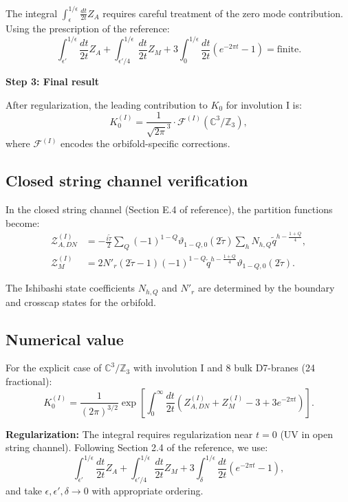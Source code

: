 \documentclass[11pt]{article}
\newcommand{\Z}{\mathbb{Z}}
\newcommand{\C}{\mathbb{C}}
\newcommand{\vt}{\vartheta}
\newcommand{\ttau}{\tilde{\tau}}
\newcommand{\ctau}{\check{\tau}}
\newcommand{\cq}{\check{q}}
\newcommand{\tq}{\tilde{q}}
\begin{document}
The integral $\int_{\epsilon}^{1/\epsilon} \frac{dt}{2t} Z_A$ requires careful treatment of the zero mode contribution. Using the prescription of the reference:
\begin{equation}
\int_{\epsilon'}^{1/\epsilon} \frac{dt}{2t} Z_A + \int_{\epsilon'/4}^{1/\epsilon} \frac{dt}{2t} Z_M + 3\int_0^{1/\epsilon} \frac{dt}{2t}(e^{-2\pi t} - 1) = \text{finite}.
\end{equation}

\textbf{Step 3: Final result}

After regularization, the leading contribution to $K_0$ for involution I is:
\begin{equation}
K_0^{(I)} = \frac{1}{\sqrt{2\pi}^3} \cdot \mathcal{F}^{(I)}(\C^3/\Z_3),
\end{equation}
where $\mathcal{F}^{(I)}$ encodes the orbifold-specific corrections.

\subsection{Closed string channel verification}

In the closed string channel (Section E.4 of reference), the partition functions become:
\begin{align}
\mathcal{Z}_{A,DN}^{(I)} &= -\frac{i\ttau}{2} \sum_{Q} (-1)^{1-Q} \vt_{1-Q,0}(2\ttau) \sum_h N_{h,Q} \tq^{h - \frac{1+Q}{4}}, \\
\mathcal{Z}_M^{(I)} &= 2 N'_r (2\ctau - 1) (-1)^{1-Q} \cq^{h - \frac{1+Q}{4}} \vt_{1-Q,0}(2\ctau).
\end{align}

The Ishibashi state coefficients $N_{h,Q}$ and $N'_r$ are determined by the boundary and crosscap states for the orbifold.

\subsection{Numerical value}

For the explicit case of $\C^3/\Z_3$ with involution I and 8 bulk D7-branes (24 fractional):
\begin{equation}
K_0^{(I)} = \frac{1}{(2\pi)^{3/2}} \exp\left[ \int_0^\infty \frac{dt}{2t} \left( Z_{A,DN}^{(I)} + Z_M^{(I)} - 3 + 3 e^{-2\pi t} \right) \right].
\end{equation}

\textbf{Regularization:} The integral requires regularization near $t = 0$ (UV in open string channel). Following Section 2.4 of the reference, we use:
\begin{equation}
\int_{\epsilon'}^{1/\epsilon} \frac{dt}{2t} Z_A + \int_{\epsilon'/4}^{1/\epsilon} \frac{dt}{2t} Z_M + 3\int_\delta^{1/\epsilon} \frac{dt}{2t}(e^{-2\pi t} - 1),
\end{equation}
and take $\epsilon, \epsilon', \delta \to 0$ with appropriate ordering.
\end{document}
